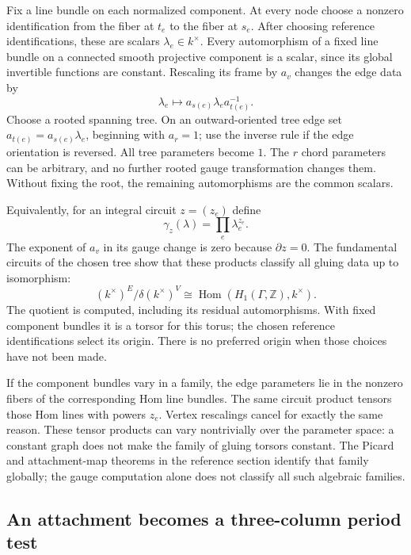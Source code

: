 \documentclass[11pt]{article}
\theoremstyle{definition}
\theoremstyle{remark}
\newcommand{\Z}{\mathbb Z}
\begin{document}
Fix a line bundle on each normalized component. At every node choose a nonzero identification from the fiber at $t_e$ to the fiber at $s_e$. After choosing reference identifications, these are scalars $\lambda_e\in k^\times$. Every automorphism of a fixed line bundle on a connected smooth projective component is a scalar, since its global invertible functions are constant. Rescaling its frame by $a_v$ changes the edge data by
\[
 \lambda_e\longmapsto a_{s(e)}\lambda_e a_{t(e)}^{-1}.
\]
Choose a rooted spanning tree. On an outward-oriented tree edge set $a_{t(e)}=a_{s(e)}\lambda_e$, beginning with $a_r=1$; use the inverse rule if the edge orientation is reversed. All tree parameters become $1$. The $r$ chord parameters can be arbitrary, and no further rooted gauge transformation changes them. Without fixing the root, the remaining automorphisms are the common scalars.

Equivalently, for an integral circuit $z=(z_e)$ define
\[
 \gamma_z(\lambda)=\prod_e\lambda_e^{z_e}.
\]
The exponent of $a_v$ in its gauge change is zero because $\partial z=0$. The fundamental circuits of the chosen tree show that these products classify all gluing data up to isomorphism:
\[
 (k^\times)^E/\delta(k^\times)^V
       \cong\operatorname{Hom}(H_1(\Gamma,\Z),k^\times).
\]
The quotient is computed, including its residual automorphisms. With fixed component bundles it is a torsor for this torus; the chosen reference identifications select its origin. There is no preferred origin when those choices have not been made.

If the component bundles vary in a family, the edge parameters lie in the nonzero fibers of the corresponding Hom line bundles. The same circuit product tensors those Hom lines with powers $z_e$. Vertex rescalings cancel for exactly the same reason. These tensor products can vary nontrivially over the parameter space: a constant graph does not make the family of gluing torsors constant. The Picard and attachment-map theorems in the reference section identify that family globally; the gauge computation alone does not classify all such algebraic families.

\subsection{An attachment becomes a three-column period test}
\label{sec:attachment-period-calculus}
\end{document}
